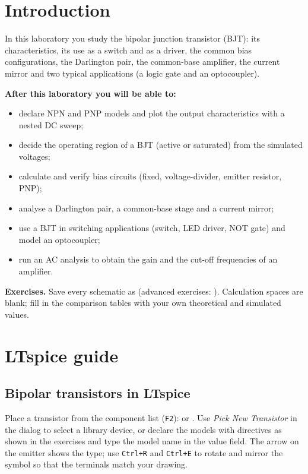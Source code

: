 
\section{Introduction}
In this laboratory you study the bipolar junction transistor (BJT): its characteristics, its use as a switch and as a driver, the common bias configurations, the Darlington pair, the common-base amplifier, the current mirror and two typical applications (a logic gate and an optocoupler).

\textbf{After this laboratory you will be able to:}
\begin{itemize}
  \item declare NPN and PNP models and plot the output characteristics with a nested DC sweep;
  \item decide the operating region of a BJT (active or saturated) from the simulated voltages;
  \item calculate and verify bias circuits (fixed, voltage-divider, emitter resistor, PNP);
  \item analyse a Darlington pair, a common-base stage and a current mirror;
  \item use a BJT in switching applications (switch, LED driver, NOT gate) and model an optocoupler;
  \item run an AC analysis to obtain the gain and the cut-off frequencies of an amplifier.
\end{itemize}

\textbf{Exercises.} Save every schematic as  (advanced exercises: ). Calculation spaces are blank; fill in the comparison tables with your own theoretical and simulated values.

\section{LTspice guide}

\subsection{Bipolar transistors in LTspice}
Place a transistor from the component list (\texttt{F2}):  or . Use \textit{Pick New Transistor} in the dialog to select a library device, or declare the models with directives as shown in the exercises and type the model name in the value field. The arrow on the emitter shows the type; use \texttt{Ctrl+R} and \texttt{Ctrl+E} to rotate and mirror the symbol so that the terminals match your drawing.

